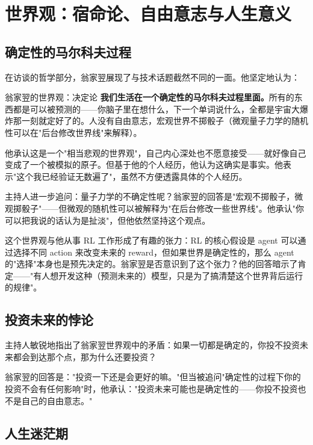 \section{世界观：宿命论、自由意志与人生意义}

\subsection{确定性的马尔科夫过程}

在访谈的哲学部分，翁家翌展现了与技术话题截然不同的一面。他坚定地认为：

\begin{importantbox}{翁家翌的世界观：决定论}
\textbf{我们生活在一个确定性的马尔科夫过程里面。}所有的东西都是可以被预测的——你脑子里在想什么，下一个单词说什么，全都是宇宙大爆炸那一刻就定好了的。人没有自由意志，宏观世界不掷骰子（微观量子力学的随机性可以在"后台修改世界线"来解释）。
\end{importantbox}

他承认这是一个"相当悲观的世界观"，自己内心深处也不愿意接受——就好像自己变成了一个被模拟的原子。但基于他的个人经历，他认为这确实是事实。他表示"这个我已经验证无数遍了"，虽然不方便透露具体的个人经历。

主持人进一步追问：量子力学的不确定性呢？翁家翌的回答是"宏观不掷骰子，微观掷骰子"——但微观的随机性可以被解释为"在后台修改一些世界线"。他承认"你可以把我说的话认为是扯淡"，但他依然坚持这个观点。

这个世界观与他从事 RL 工作形成了有趣的张力：RL 的核心假设是 agent 可以通过选择不同 action 来改变未来的 reward，但如果世界是确定性的，那么 agent 的"选择"本身也是预先决定的。翁家翌是否意识到了这个张力？他的回答暗示了肯定——"有人想开发这种（预测未来的）模型，只是为了搞清楚这个世界背后运行的规律"。

\subsection{投资未来的悖论}

主持人敏锐地指出了翁家翌世界观中的矛盾：如果一切都是确定的，你投不投资未来都会到达那个点，那为什么还要投资？

翁家翌的回答是："投资一下还是会更好的嘛。"但当被追问"确定性的过程下你的投资不会有任何影响"时，他承认："投资未来可能也是确定性的——你投不投资也不是自己的自由意志。"

\subsection{人生迷茫期}

